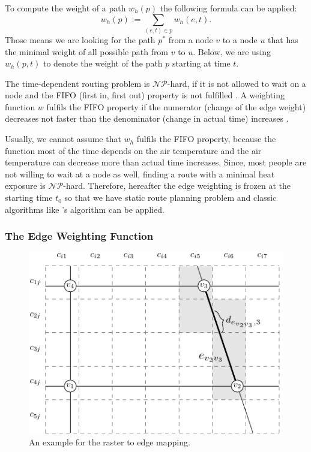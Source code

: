 To compute the weight of a path $w_h(p)$ the following formula can be applied:
	\begin{equation}\label{eq:path-weight}
		w_h(p) := \sum_{(e,t) \in p} w_h(e, t).
	\end{equation}
Those means we are looking for the path $p^*$ from a node $v$ to a node $u$ that has the minimal weight of all possible path from $v$ to $u$. Below, we are using $w_h(p, t)$ to denote the weight of the path $p$ starting at time $t$. 

The time-dependent routing problem is $\mathcal{NP}$-hard, if it is not allowed to wait on a node and the FIFO (first in, first out) property is not fulfilled \parencite{Orda1990}. A weighting function $w$ fulfils the FIFO property if the numerator (change of the edge weight) decreases not faster than the denominator (change in actual time) increases \parencite{Kaufman1993}. 

Usually, we cannot assume that $w_h$ fulfils the FIFO property, because the function most of the time depends on the air temperature and the air temperature can decrease more than actual time increases. Since, most people are not willing to wait at a node as well, finding a route with a minimal heat exposure is $\mathcal{NP}$-hard. Therefore, 
hereafter the edge weighting is frozen at the starting time $t_0$ so that we have static route planning problem and classic algorithms like  \citeauthor{Dijkstra1959}'s algorithm \parencite{Dijkstra1959} can be applied. 



\subsubsection{The Edge Weighting Function \label{sec:edge-weighting}}

\begin{figure}
	\centering
	\includegraphics{figures/raster-edge-mapping-standalone}
	\caption[Example for the raster to edge mapping]{An 
		example for the raster to edge mapping.}
	\label{fig:raster-edge-mapping}
\end{figure}

